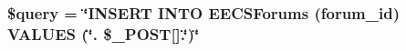 \subsubsection[{\texorpdfstring{\$query}{$query}}]{\setlength{\rightskip}{0pt plus 5cm}\$query = \char`\"{}I\+N\+S\+E\+RT I\+N\+TO E\+E\+C\+S\+Forums (forum\+\_\+id) V\+A\+L\+U\+ES (\textquotesingle{}\char`\"{}. \$\+\_\+\+P\+O\+ST\mbox{[}\textquotesingle{}\mbox{]}.\char`\"{}\textquotesingle{})\char`\"{}}\hypertarget{_create_forum_8php_af59a5f7cd609e592c41dc3643efd3c98}{}\label{_create_forum_8php_af59a5f7cd609e592c41dc3643efd3c98}
